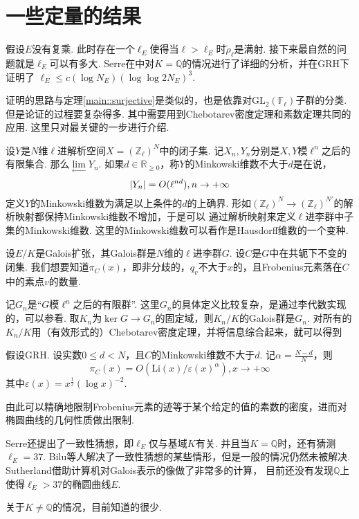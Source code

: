 \chapter{一些定量的结果}

假设$E$没有复乘. 此时存在一个$\ell_E$使得当$\ell>\ell_E$时$\tilde{\rho}_{\ell}$是满射.
接下来最自然的问题就是$\ell_{E}$可以有多大.
Serre在\parencite{serre1981quelques}中对$K=\mathbb{Q}$的情况进行了详细的分析，并在GRH下证明了
$\ell_E \leq c(\log N_E) (\log\log 2N_E)^3$. \parencite[][p. 196]{serre1981quelques}

证明的思路与定理\ref{main::surjective}是类似的，也是依靠对$\mathrm{GL}_2(\mathbb{F}_{\ell})$子群的分类.
但是论证的过程要复杂得多.
其中需要用到Chebotarev密度定理和素数定理共同的应用.
这里只对最关键的一步进行介绍.

设$Y$是$N$维$\ell$进解析空间$X = (\mathbb{Z}_{\ell})^N$中的闭子集.
记$X_n,Y_n$分别是$X,Y$模$\ell^n$之后的有限集合.
那么$\lim\limits_{\longleftarrow} Y_n$.
如果$d\in \mathbb{R}_{\geq 0}$，称$Y$的Minkowski维数不大于$d$是在说，
\begin{equation}
    \left|Y_n\right| = O(\ell^{nd}),n\to +\infty
\end{equation}
定义$Y$的Minkowski维数为满足以上条件的$d$的上确界.
形如$(\mathbb{Z}_{\ell})^{N}\to (\mathbb{Z}_{\ell})^{N'}$的解析映射都保持Minkowski维数不增加，于是可以
通过解析映射来定义$\ell$进李群中子集的Minkowski维数.
这里的Minkowski维数可以看作是Hausdorff维数的一个变种.

设$E/K$是Galois扩张，其Galois群是$N$维的$\ell$进李群$G$. 设$C$是$G$中在共轭下不变的闭集.
我们想要知道$\pi_C(x)$，即非分歧的，$q_v$不大于$x$的，且Frobenius元素落在$C$中的素点$v$的数量.

记$G_n$是“$G$模$\ell^n$之后的有限群”.
这里$G_n$的具体定义比较复杂，是通过李代数实现的，可以参看\parencite[][p. 151]{serre1981quelques}.
取$K_n$为$\ker G\to G_n$的固定域，则$K_n/K$的Galois群是$G_n$.
对所有的$K_n/K$用（有效形式的）Chebotarev密度定理，并将信息综合起来，就可以得到
\begin{cthm}
    假设GRH.
    设实数$0\leq d<N$，且$C$的Minkowski维数不大于$d$.
    记$\alpha=\frac{N-d}{N}$，则
    \begin{equation}
        \pi_C(x) = O(\mathrm{Li}(x)/\varepsilon(x)^{\alpha}), x\to +\infty
    \end{equation}
    其中$\varepsilon(x) = x^{\frac{1}{2}} (\log x)^{-2}$.
\end{cthm}

由此可以精确地限制Frobenius元素的迹等于某个给定的值的素数的密度，进而对椭圆曲线的几何性质做出限制.

Serre还提出了一致性猜想，即$\ell_{E}$仅与基域$K$有关. 并且当$K = \mathbb{Q}$时，还有猜测$\ell_{E} = 37$.
Bilu等人解决了一致性猜想的某些情形\parencite{bilu2011serre}，但是一般的情况仍然未被解决.
Sutherland\parencite{sutherland}借助计算机对Galois表示的像做了非常多的计算，
目前还没有发现$\mathbb{Q}$上使得$\ell_{E}>37$的椭圆曲线$E$.

关于$K\neq \mathbb{Q}$的情况，目前知道的很少.
